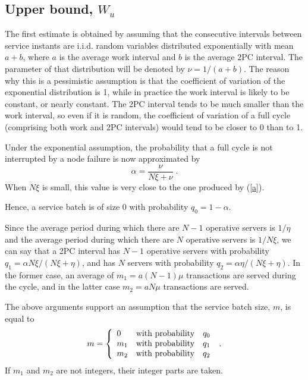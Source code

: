 \subsection{Upper bound, $W_u$}
\label{subsec:upperbound}

The first estimate is obtained by assuming that the consecutive intervals
between service instants are i.i.d. random variables distributed exponentially
with mean $a+b$, where $a$ is the average work interval and $b$ is the average
2PC interval. The parameter of that distribution will be denoted by
$\nu = 1/(a+b)$. The reason why this is a pessimistic assumption is that the
coefficient of variation of the exponential distribution is 1, while in practice the
work interval is likely to be constant, or nearly constant. The 2PC interval
tends to be much smaller than the work interval, so even if it is random, the
coefficient of variation of a full cycle (comprising both work and 2PC intervals) would tend to be closer to 0
than to 1.

Under the exponential assumption, the probability that a full cycle is not
interrupted by a node failure is now approximated by
\begin{equation} \label{a1}
\alpha = \frac{\nu}{N\xi+\nu} \;.
\end{equation}
When $N\xi$ is small, this value is very close to the one produced by (\ref{a}).

Hence, a service batch is of size 0 with probability $q_0=1-\alpha$.

Since the average period during which there are $N-1$ operative servers is
$1/\eta$ and the average period during which there are $N$ operative servers
is $1/N\xi$, we can say that a 2PC interval has $N-1$ operative servers with probability
$q_1=\alpha N\xi/(N\xi+\eta)$, and has $N$ servers with probability
$q_2=\alpha \eta/(N\xi+\eta)$. In the former case, an average of
$m_1=a(N-1)\mu$ transactions are served during the cycle, and in the latter case
$m_2=aN\mu$ transactions are served.

The above arguments support an assumption that the service batch size, $m$,
is equal to
\begin{equation}
m = \left \{
    \begin{array}{lll}
        0 &{\rm with~probability} &q_0 \\
        m_1 &{\rm with~probability} &q_1 \\
        m_2 &{\rm with~probability} &q_2 \\
    \end{array} \right .
 \;.
\end{equation}
If $m_1$ and $m_2$ are not integers, their integer parts are taken.

